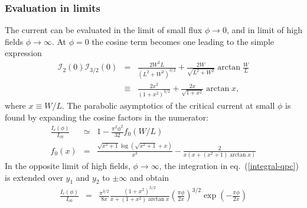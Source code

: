 \subsubsection*{Evaluation in limits}
The current can be evaluated in the limit of small flux $\phi \rightarrow 0$, and in limit of high fields $\phi \rightarrow \infty$. 
At $\phi=0$ the cosine term becomes one leading to the simple expression
\begin{eqnarray}
\mathcal{I}_2(0)\mathcal{I}_{3/2}(0) &=&
\frac{2 W^2 L}{\left( L^2 + W^2 \right)^{3/2}} + \frac{2W}{\sqrt{L^2 + W^2}} \arctan \frac{W}{L}  \\
&\equiv & \frac{2 x^2}{\left( 1 + x^2 \right)^{3/2}} + \frac{2 x}{\sqrt{1 + x^2} } \arctan x,
\label{Ic-0}
\end{eqnarray}
where $x \equiv W/L$.
The parabolic asymptotics of the critical current at small $\phi$ is found by expanding the cosine factors in the numerator:
\begin{eqnarray}
\frac{I_c(\phi)}{I_{c0}}&\simeq& 1 - \frac{\pi ^2 \phi^2 }{32} f_0(W/L) \\
f_0(x) &=& \frac{\sqrt{x^2+1} \log \left(\sqrt{x^2+1}+x\right)}{x^3} - \frac{2}{x (x+(x^2+1) \arctan x)} 
\end{eqnarray}
In the opposite limit of high fields, $\phi\to \infty$, the integration in eq.~(\ref{integral-qpc}) is extended over $y_1$ and $y_2$ to $\pm \infty$ and obtain
\begin{eqnarray}
\frac{I_c(\phi)}{I_{c0}} &=& \frac{\pi^{3/2}}{8 x} \frac{(1 + x^2)^{3/2}}{x + (1+x^2) \arctan x} \left( \frac{\pi \phi}{2 x} \right)^{3/2} \exp \left( - \frac{\pi \phi}{2 x} \right)
\label{eq:large-phi}
\end{eqnarray}
\newpage
